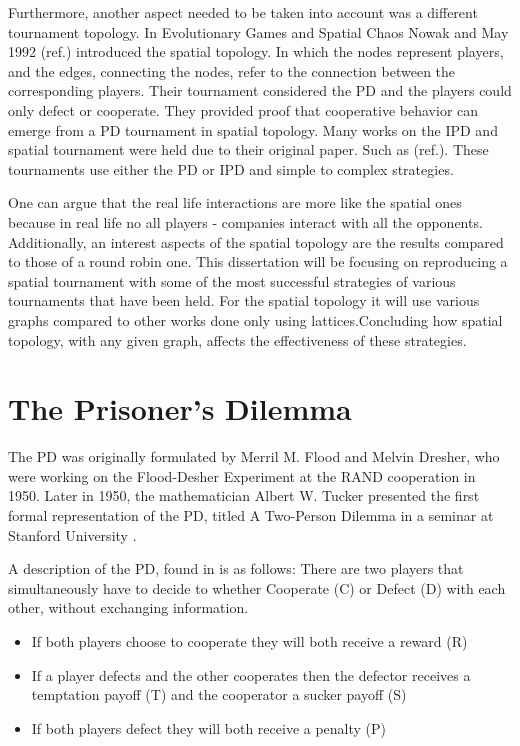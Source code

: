 Furthermore, another aspect needed to be taken into account was a different
tournament topology. In Evolutionary Games and Spatial Chaos Nowak and May 1992
(ref.)
introduced the spatial topology. In which the nodes represent players, and the
edges, connecting the nodes, refer to the connection between the corresponding
players. Their tournament considered the PD and the players could only defect or cooperate.
They provided proof that cooperative behavior can emerge from a PD tournament in
spatial topology. Many works on the IPD and spatial tournament were held due to
their original paper. Such as (ref.).
These tournaments use either the PD or IPD and simple to complex strategies.

One can argue that the real life interactions are more like the spatial ones
because in real life no all players - companies interact with all the opponents.
Additionally, an interest aspects of the spatial topology are the results compared
to those of a round robin one. This dissertation will be focusing on reproducing
a spatial tournament with some of the most successful strategies of various
tournaments that have been held. For the spatial topology it will use various
graphs compared to other works done only using lattices.Concluding how spatial
topology, with any given graph, affects the effectiveness of these strategies.

\section{The Prisoner's Dilemma}

The PD was originally formulated by Merril M. Flood and Melvin Dresher,
who were working on the Flood-Desher Experiment at the RAND cooperation in 1950.
Later in 1950, the mathematician Albert W. Tucker presented the first formal
representation of the PD, titled  A Two-Person Dilemma in a seminar at
Stanford University \parencite{Gass005}.

A description of the PD, found in \parencite{Li2011} is as follows:
There are two players that simultaneously have to decide to whether Cooperate (C)
or Defect (D) with each other, without exchanging information.

\begin{itemize}
  \item If both players choose to cooperate they will both receive a reward (R)
  \item If a player defects and the other cooperates then the defector receives
  a temptation payoff (T) and the cooperator a sucker payoff (S)
  \item If both players defect they will both receive a penalty (P)
\end{itemize}

